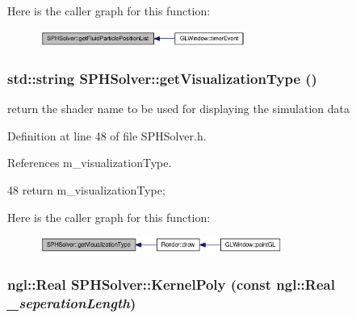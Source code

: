 Here is the caller graph for this function:\nopagebreak
\begin{figure}[H]
\begin{center}
\leavevmode
\includegraphics[width=191pt]{class_s_p_h_solver_ab8ad27fc25e030d731e249ccfd2efd20_icgraph}
\end{center}
\end{figure}


\hypertarget{class_s_p_h_solver_adcadefbe7d620b8782065a8899bc8040}{
\subsubsection[{getVisualizationType}]{\setlength{\rightskip}{0pt plus 5cm}std::string SPHSolver::getVisualizationType ()}}
\label{class_s_p_h_solver_adcadefbe7d620b8782065a8899bc8040}


return the shader name to be used for displaying the simulation data 



Definition at line 48 of file SPHSolver.h.



References m\_\-visualizationType.




\begin{DoxyCode}
48 {return m_visualizationType;}
\end{DoxyCode}




Here is the caller graph for this function:\nopagebreak
\begin{figure}[H]
\begin{center}
\leavevmode
\includegraphics[width=226pt]{class_s_p_h_solver_adcadefbe7d620b8782065a8899bc8040_icgraph}
\end{center}
\end{figure}


\hypertarget{class_s_p_h_solver_a293590ab5fbacd0a13bbd36dc3971e8d}{
\subsubsection[{KernelPoly}]{\setlength{\rightskip}{0pt plus 5cm}ngl::Real SPHSolver::KernelPoly (const ngl::Real {\em \_\-seperationLength})}}
\label{class_s_p_h_solver_a293590ab5fbacd0a13bbd36dc3971e8d}


